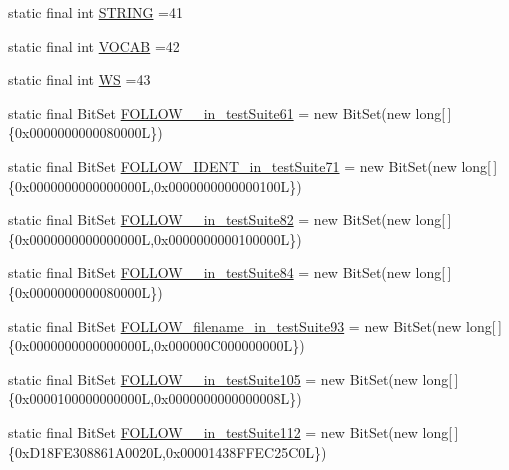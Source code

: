 \begin{DoxyCompactItemize}
\item 
static final int \hyperlink{classorg_1_1tzi_1_1use_1_1parser_1_1testsuite_1_1_test_suite_parser_a49529bd30a8b1ad4b7d1ad0adbd93103}{S\-T\-R\-I\-N\-G} =41
\item 
static final int \hyperlink{classorg_1_1tzi_1_1use_1_1parser_1_1testsuite_1_1_test_suite_parser_a763cea1a91eece06667dfedb473f9743}{V\-O\-C\-A\-B} =42
\item 
static final int \hyperlink{classorg_1_1tzi_1_1use_1_1parser_1_1testsuite_1_1_test_suite_parser_a1121e0f6131402e91e13d4364026a39f}{W\-S} =43
\item 
static final Bit\-Set \hyperlink{classorg_1_1tzi_1_1use_1_1parser_1_1testsuite_1_1_test_suite_parser_a1a38865491a84e27d95044131db945e0}{F\-O\-L\-L\-O\-W\-\_\-\_\-in\-\_\-test\-Suite61} = new Bit\-Set(new long\mbox{[}$\,$\mbox{]}\{0x0000000000080000\-L\})
\item 
static final Bit\-Set \hyperlink{classorg_1_1tzi_1_1use_1_1parser_1_1testsuite_1_1_test_suite_parser_a04b3295bd7bd36daad0a0ba294b2e2e6}{F\-O\-L\-L\-O\-W\-\_\-\-I\-D\-E\-N\-T\-\_\-in\-\_\-test\-Suite71} = new Bit\-Set(new long\mbox{[}$\,$\mbox{]}\{0x0000000000000000\-L,0x0000000000000100\-L\})
\item 
static final Bit\-Set \hyperlink{classorg_1_1tzi_1_1use_1_1parser_1_1testsuite_1_1_test_suite_parser_a48d349fc148cea0701a14bb4f4aae488}{F\-O\-L\-L\-O\-W\-\_\-\_\-in\-\_\-test\-Suite82} = new Bit\-Set(new long\mbox{[}$\,$\mbox{]}\{0x0000000000000000\-L,0x0000000000100000\-L\})
\item 
static final Bit\-Set \hyperlink{classorg_1_1tzi_1_1use_1_1parser_1_1testsuite_1_1_test_suite_parser_aba3d2604823ffc69b13f28a80de1ac66}{F\-O\-L\-L\-O\-W\-\_\-\_\-in\-\_\-test\-Suite84} = new Bit\-Set(new long\mbox{[}$\,$\mbox{]}\{0x0000000000080000\-L\})
\item 
static final Bit\-Set \hyperlink{classorg_1_1tzi_1_1use_1_1parser_1_1testsuite_1_1_test_suite_parser_ac8d2024774b4b2f9653b4a96d1a2202f}{F\-O\-L\-L\-O\-W\-\_\-filename\-\_\-in\-\_\-test\-Suite93} = new Bit\-Set(new long\mbox{[}$\,$\mbox{]}\{0x0000000000000000\-L,0x000000\-C000000000\-L\})
\item 
static final Bit\-Set \hyperlink{classorg_1_1tzi_1_1use_1_1parser_1_1testsuite_1_1_test_suite_parser_a31712f1db9c4732cb45e757b8459854a}{F\-O\-L\-L\-O\-W\-\_\-\_\-in\-\_\-test\-Suite105} = new Bit\-Set(new long\mbox{[}$\,$\mbox{]}\{0x0000100000000000\-L,0x0000000000000008\-L\})
\item 
static final Bit\-Set \hyperlink{classorg_1_1tzi_1_1use_1_1parser_1_1testsuite_1_1_test_suite_parser_a159509d0c941b5846bebf45594ada128}{F\-O\-L\-L\-O\-W\-\_\-\_\-in\-\_\-test\-Suite112} = new Bit\-Set(new long\mbox{[}$\,$\mbox{]}\{0x\-D18\-F\-E308861\-A0020\-L,0x00001438\-F\-F\-E\-C25\-C0\-L\})

\end{DoxyCompactItemize}
